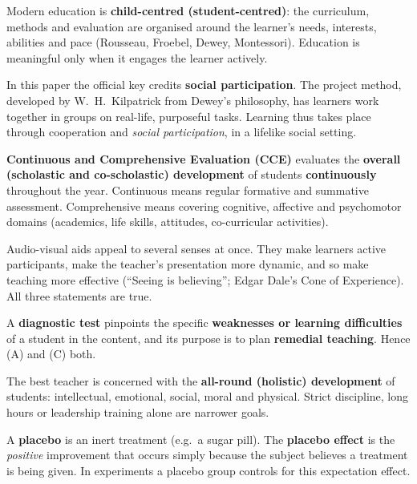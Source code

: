 Modern education is \textbf{child-centred (student-centred)}: the curriculum, methods and evaluation are organised around the learner's needs, interests, abilities and pace (Rousseau, Froebel, Dewey, Montessori). Education is meaningful only when it engages the learner actively.

In this paper the official key credits \textbf{social participation}. The project method, developed by W.~H.~Kilpatrick from Dewey's philosophy, has learners work together in groups on real-life, purposeful tasks. Learning thus takes place through cooperation and \emph{social participation}, in a lifelike social setting.

\textbf{Continuous and Comprehensive Evaluation (CCE)} evaluates the \textbf{overall (scholastic and co-scholastic) development} of students \textbf{continuously} throughout the year. Continuous means regular formative and summative assessment. Comprehensive means covering cognitive, affective and psychomotor domains (academics, life skills, attitudes, co-curricular activities).

Audio-visual aids appeal to several senses at once. They make learners active participants, make the teacher's presentation more dynamic, and so make teaching more effective (``Seeing is believing''; Edgar Dale's Cone of Experience). All three statements are true.

A \textbf{diagnostic test} pinpoints the specific \textbf{weaknesses or learning difficulties} of a student in the content, and its purpose is to plan \textbf{remedial teaching}. Hence (A) and (C) both.

The best teacher is concerned with the \textbf{all-round (holistic) development} of students: intellectual, emotional, social, moral and physical. Strict discipline, long hours or leadership training alone are narrower goals.

A \textbf{placebo} is an inert treatment (e.g.\ a sugar pill). The \textbf{placebo effect} is the \emph{positive} improvement that occurs simply because the subject believes a treatment is being given. In experiments a placebo group controls for this expectation effect.

